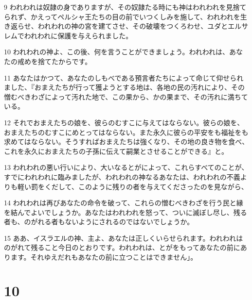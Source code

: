 \par 9 われわれは奴隷の身でありますが、その奴隷たる時にも神はわれわれを見捨てられず、かえってペルシャ王たちの目の前でいつくしみを施して、われわれを生き返らせ、われわれの神の宮を建てさせ、その破壊をつくろわせ、ユダとエルサレムでわれわれに保護を与えられました。
\par 10 われわれの神よ、この後、何を言うことができましょう。われわれは、あなたの戒めを捨てたからです。
\par 11 あなたはかつて、あなたのしもべである預言者たちによって命じて仰せられました、『おまえたちが行って獲ようとする地は、各地の民の汚れにより、その憎むべきわざによって汚れた地で、この果から、かの果まで、その汚れに満ちている。
\par 12 それでおまえたちの娘を、彼らのむすこに与えてはならない。彼らの娘を、おまえたちのむすこにめとってはならない。また永久に彼らの平安をも福祉をも求めてはならない。そうすればおまえたちは強くなり、その地の良き物を食べ、これを永久におまえたちの子孫に伝えて嗣業とさせることができる』と。
\par 13 われわれの悪い行いにより、大いなるとがによって、これらすべてのことが、すでにわれわれに臨みましたが、われわれの神なるあなたは、われわれの不義よりも軽い罰をくだして、このように残りの者を与えてくださったのを見ながら、
\par 14 われわれは再びあなたの命令を破って、これらの憎むべきわざを行う民と縁を結んでよいでしょうか。あなたはわれわれを怒って、ついに滅ぼし尽し、残る者も、のがれる者もないようにされるのではないでしょうか。
\par 15 ああ、イスラエルの神、主よ、あなたは正しくいらせられます。われわれはのがれて残ること今日のとおりです。われわれは、とがをもってあなたの前にあります。それゆえだれもあなたの前に立つことはできません」。

\chapter{10}

